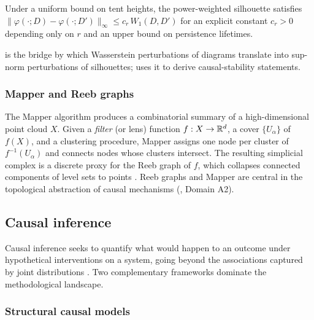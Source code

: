 \begin{lemma}
\label{lem:silhouette_stability}
Under a uniform bound on tent heights, the power-weighted silhouette
satisfies
$\|\varphi(\cdot; D) - \varphi(\cdot; D')\|_\infty \le c_r \, W_1(D, D')$
for an explicit constant $c_r > 0$ depending only on $r$ and an upper bound
on persistence lifetimes.
\end{lemma}

 is the bridge by which Wasserstein
perturbations of diagrams translate into sup-norm perturbations of
silhouettes;  uses it to derive causal-stability
statements.

\subsubsection{Mapper and Reeb graphs}

The Mapper algorithm
\citep{singh2007mapper,madukpe2026mapper,dlotko2019ball} produces a
combinatorial summary of a high-dimensional point cloud $X$. Given a
\emph{filter} (or lens) function $f : X \to \mathbb{R}^d$, a cover
$\{U_\alpha\}$ of $f(X)$, and a clustering procedure, Mapper assigns one
node per cluster of $f^{-1}(U_\alpha)$ and connects nodes whose clusters
intersect. The resulting simplicial complex is a discrete proxy for the
Reeb graph of $f$, which collapses connected components of level sets to
points
\citep{biasotti2008reeb,bauer2013measuring,morozov2013interleaving}. Reeb
graphs and Mapper are central in the topological abstraction of causal
mechanisms (, Domain A2).

\subsection{Causal inference}
\label{sec:prelim_ci}

Causal inference seeks to quantify what would happen to an outcome under
hypothetical interventions on a system, going beyond the associations
captured by joint distributions
\citep{pearl2009causality,imbens2015causal,peters2017elements,
spirtes2001causation}. Two complementary frameworks dominate the
methodological landscape.

\subsubsection{Structural causal models}


